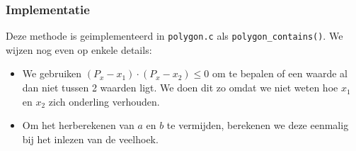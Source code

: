 \subsubsection{Implementatie}
Deze methode is geimplementeerd in \texttt{polygon.c} als \texttt{polygon\_contains()}. 
We wijzen nog even op enkele details:
\begin{itemize}
\item We gebruiken $(P_x-x_1)\cdot(P_x-x_2)\leq0$ om te bepalen of een waarde al dan niet 
		tussen 2 waarden ligt. We doen dit zo omdat we niet weten hoe $x_1$ en $x_2$ 
		zich onderling verhouden.
\item Om het herberekenen van $a$ en $b$ te vermijden, berekenen we deze eenmalig bij het inlezen van de veelhoek.

\end{itemize}


 
